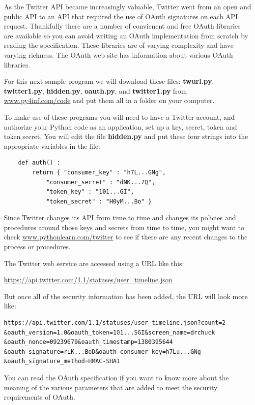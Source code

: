 \documentclass[11pt]{book}
\begin{document}
As the Twitter API became increasingly valuable, Twitter
went from an open and public API to an API that required
the use of OAuth signatures on each API request. Thankfully
there are a number of convienent and free OAuth libraries
are available 
so you can avoid writing an OAuth implementation from scratch
by reading the specification.  These libraries are of 
varying complexity and have varying 
richness.  The OAuth web site has information about various 
OAuth libraries.

For this next sample program we will download these files: 
{\bf twurl.py}, {\bf twitter1.py}, {\bf hidden.py}, 
{\bf oauth.py}, 
and
{\bf twitter1.py} from 
\url{www.py4inf.com/code} and put them all in a folder
on your computer.

To make use of these programs you will need to have a Twitter
account, and authorize your Python code as an application,
set up a key, secret, token and token secret.  You will edit
the file {\bf hidden.py} and put these four strings into the
appropriate variables in the file:

\beforeverb
\begin{verbatim}
    def auth() :
        return { "consumer_key" : "h7L...GNg",
            "consumer_secret" : "dNK...7Q",
            "token_key" : "101...GI",
            "token_secret" : "H0yM...Bo" }
\end{verbatim}
\afterverb
%
Since Twitter changes its API from time to time and changes
its policies and procedures around those keys and secrets
from time to time, you might want to check
\url{www.pythonlearn.com/twitter}
to see if there are any recent changes to the process 
or procedures.

The Twitter web service are accessed using a URL like this:

\url{https://api.twitter.com/1.1/statuses/user_timeline.json}

But once all of the security information has been added, the URL
will look more like:

\beforeverb
\begin{verbatim}
https://api.twitter.com/1.1/statuses/user_timeline.json?count=2
&oauth_version=1.0&oauth_token=101...SGI&screen_name=drchuck
&oauth_nonce=09239679&oauth_timestamp=1380395644
&oauth_signature=rLK...BoD&oauth_consumer_key=h7Lu...GNg
&oauth_signature_method=HMAC-SHA1
\end{verbatim}
\afterverb
%
You can read the OAuth specification if you want to
know more about the meaning of the various parameters that
are added to meet the security requirements of OAuth.  
\end{document}

